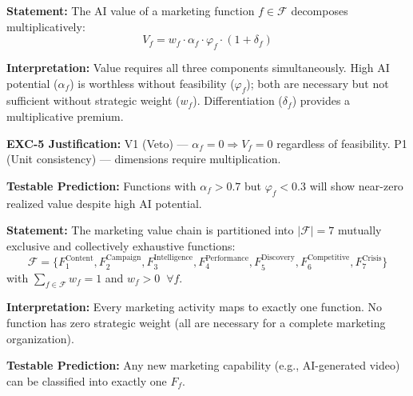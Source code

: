 \begin{tcolorbox}[colback=gray!5!white, colframe=gray!75!black,
    title=Axiom AIM-1: Multiplicative Value Decomposition]
\label{ax:aim-1}

\textbf{Statement:}
The AI value of a marketing function $f \in \mathcal{F}$ decomposes multiplicatively:
\begin{equation}
V_f = w_f \cdot \alpha_f \cdot \varphi_f \cdot (1 + \delta_f)
\label{eq:aim-value-decomposition}
\end{equation}

\textbf{Interpretation:} Value requires all three components simultaneously.
High AI potential ($\alpha_f$) is worthless without feasibility ($\varphi_f$);
both are necessary but not sufficient without strategic weight ($w_f$).
Differentiation ($\delta_f$) provides a multiplicative premium.

\textbf{EXC-5 Justification:} V1 (Veto) --- $\alpha_f = 0 \Rightarrow V_f = 0$
regardless of feasibility. P1 (Unit consistency) --- dimensions require
multiplication.

\textbf{Testable Prediction:} Functions with $\alpha_f > 0.7$ but $\varphi_f < 0.3$
will show near-zero realized value despite high AI potential.
\end{tcolorbox}


\begin{tcolorbox}[colback=gray!5!white, colframe=gray!75!black,
    title=Axiom AIM-2: Exhaustive Function Space]
\label{ax:aim-2}

\textbf{Statement:}
The marketing value chain is partitioned into $|\mathcal{F}| = 7$ mutually
exclusive and collectively exhaustive functions:
\begin{equation}
\mathcal{F} = \{F_1^{\text{Content}}, F_2^{\text{Campaign}}, F_3^{\text{Intelligence}},
F_4^{\text{Performance}}, F_5^{\text{Discovery}}, F_6^{\text{Competitive}}, F_7^{\text{Crisis}}\}
\label{eq:aim-function-space}
\end{equation}
with $\sum_{f \in \mathcal{F}} w_f = 1$ and $w_f > 0 \;\; \forall f$.

\textbf{Interpretation:} Every marketing activity maps to exactly one function.
No function has zero strategic weight (all are necessary for a complete
marketing organization).

\textbf{Testable Prediction:} Any new marketing capability (e.g., AI-generated
video) can be classified into exactly one $F_f$.
\end{tcolorbox}


